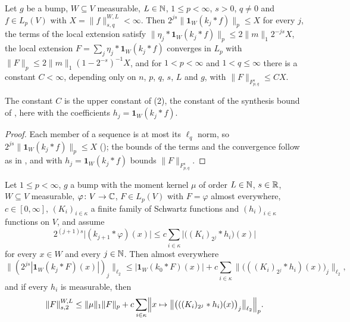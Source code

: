 \begin{lemma}
\label{lem:tl-local-extension}
\leanok
{}
Let $g$ be a bump, $W \subseteq V$ measurable, $L \in \mathbb{N}$, $1 \leq p < \infty$, $s > 0$,
$q \neq 0$ and $f \in L_p(V)$ with $X = \|f\|^{W,L}_{s,q} < \infty$. Then
$2^{js} \|\mathbf 1_W (k_j * f)\|_p \leq X$ for every $j$, the terms of the local extension
satisfy $\|\eta_j * \mathbf 1_W (k_j * f)\|_p \leq 2 \|m\|_1 2^{-js} X$, the local extension
$F = \sum_j \eta_j * \mathbf 1_W (k_j * f)$ converges in $L_p$ with
$\|F\|_p \leq 2 \|m\|_1 (1 - 2^{-s})^{-1} X$, and for $1 < p < \infty$ and $1 < q \leq \infty$
there is a constant $C < \infty$, depending only on $n$, $p$, $q$, $s$, $L$ and $g$, with
$\|F\|_{F^s_{p,q}} \leq C X$.
\end{lemma}

The constant $C$ is the upper constant of  (2), the constant of the
synthesis bound of , here with the coefficients
$h_j = \mathbf 1_W (k_j * f)$.

\begin{proof}
\leanok
Each member of a sequence is at most its $\ell_q$ norm, so
$2^{js} \|\mathbf 1_W (k_j * f)\|_p \leq X$ (); the bounds of the
terms and the convergence follow as in , and
 with $h_j = \mathbf 1_W (k_j * f)$ bounds $\|F\|_{F^s_{p,q}}$.
\end{proof}

\begin{lemma}
\label{lem:tl-local-means-pointwise}
\leanok
{}
Let $1 \leq p < \infty$, $g$ a bump with the moment kernel $\mu$ of order $L \in \mathbb{N}$, $s \in \mathbb{R}$,
$W \subseteq V$ measurable, $\varphi \colon V \to \mathbb{C}$, $F \in L_p(V)$ with $F = \varphi$ almost
everywhere, $c \in [0, \infty]$, $(K_i)_{i \in \kappa}$ a finite family of Schwartz functions and
$(h_i)_{i \in \kappa}$ functions on $V$, and assume
\[
  2^{(j+1)s} \bigl|(k_{j+1} * \varphi)(x)\bigr| \leq c \sum_{i \in \kappa}
  \bigl|\bigl((K_i)_{2^j} * h_i\bigr)(x)\bigr|
\]
for every $x \in W$ and every $j \in \mathbb{N}$. Then almost everywhere
\[
  \bigl\|(2^{js} |\mathbf 1_W (k_j * F)(x)|)_j\bigr\|_{\ell_2} \leq |\mathbf 1_W (k_0 * F)(x)|
  + c \sum_{i \in \kappa} \bigl\|\bigl(((K_i)_{2^j} * h_i)(x)\bigr)_j\bigr\|_{\ell_2} ,
\]
and if every $h_i$ is measurable, then
\[
  \|F\|^{W,L}_{s,2} \leq \|\mu\|_1 \|F\|_p + c \sum_{i \in \kappa} \Bigl\| x \mapsto
  \bigl\|\bigl(((K_i)_{2^j} * h_i)(x)\bigr)_j\bigr\|_{\ell_2} \Bigr\|_p .
\]
\end{lemma}

